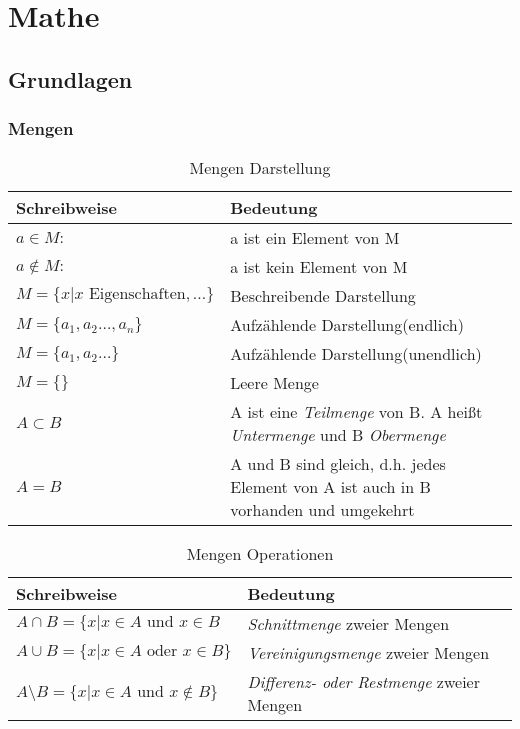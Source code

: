 \chapter{Mathe}
\section{Grundlagen}
\subsection{Mengen}

\begin{table}[htbp]
 \caption{Mengen Darstellung}
\label{tab:mengen:1}
\begin{tabularx}{\textwidth}{lX}

\toprule
 Schreibweise & Bedeutung \\
\midrule
$a \in M:$ & a ist ein Element von M \\
$a \not \in M:$ & a ist kein Element von M \\
$M=\{x | x \text{ Eigenschaften},\ldots\}$ & Beschreibende Darstellung \\
$M=\{a_1,a_2\ldots,a_n\}$ &Aufzählende Darstellung(endlich) \\
$M=\{a_1,a_2\ldots\}$ & Aufzählende Darstellung(unendlich) \\
$M=\{\}$ &Leere Menge \\
$A\subset B$ & A ist eine \emph{Teilmenge} von B. A heißt \emph{Untermenge} und B \emph{Obermenge}\\
$A=B$ & A und B sind gleich, d.h. jedes Element von A ist auch in B vorhanden und umgekehrt\\
\bottomrule
\end{tabularx}

\end{table}

\begin{table}[htbp]
 \caption{Mengen Operationen}
\label{tab:mengen:2}
\begin{tabularx}{\textwidth}{lX}
\toprule
 Schreibweise & Bedeutung \\
\midrule
$A\cap B=\{x|x\in A \text{ und } x\in B$ & \emph{Schnittmenge} zweier Mengen \\
$A\cup B=\{x|x\in A \text{ oder } x\in B\}$ & \emph{Vereinigungsmenge} zweier Mengen \\
$A\setminus B=\{x|x\in A \text{ und } x\not \in B\}$ & \emph{Differenz- oder Restmenge} zweier Mengen \\
\bottomrule
\end{tabularx}

\end{table}

